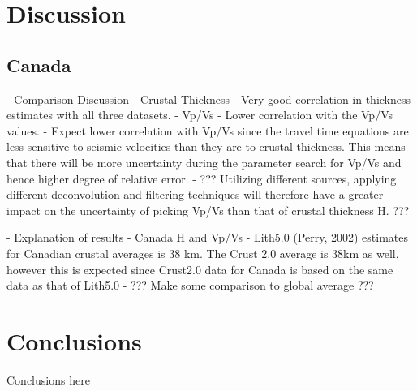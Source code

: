 \documentclass[draft, 12pt]{article}
\begin{document}



\section{Discussion}
\subsection{Canada}

  - Comparison Discussion
    - Crustal Thickness
      - Very good correlation in thickness estimates with all three datasets.
    - Vp/Vs
      - Lower correlation with the Vp/Vs values.
        - Expect lower correlation with Vp/Vs since the travel time equations are
          less sensitive to seismic velocities than they are to crustal thickness.
          This means that there will be more uncertainty during the parameter
          search for Vp/Vs and hence higher degree of relative error.
        - ??? Utilizing different sources, applying different deconvolution and
          filtering techniques will therefore have a greater impact on the
          uncertainty of picking Vp/Vs than that of crustal thickness H. ???

   - Explanation of results
    - Canada H and Vp/Vs
      - Lith5.0 (Perry, 2002) estimates for Canadian crustal averages is 38 km. The Crust
        2.0 average is 38km as well, however this is expected since Crust2.0 data for
        Canada is based on the same data as that of Lith5.0
      - ??? Make some comparison to global average ???


\section{Conclusions}
Conclusions here

\end{document}
